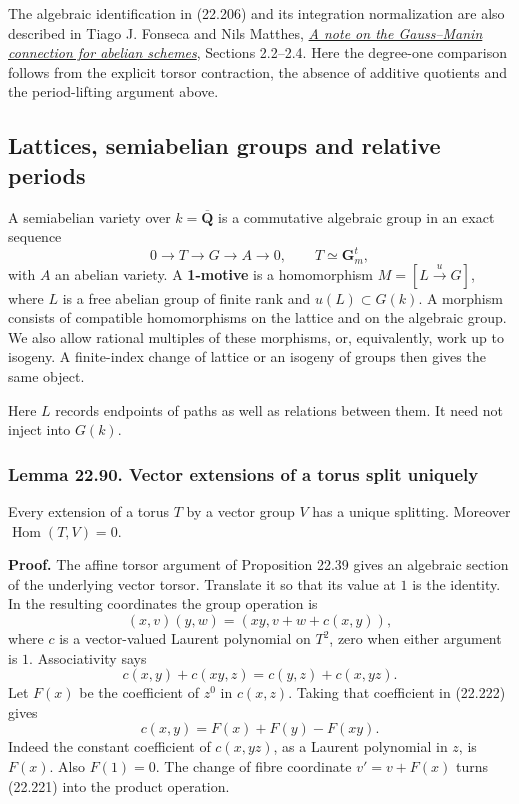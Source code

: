 \documentclass[
  11pt,
  a4paper,
]{article}
\begin{document}
The algebraic identification in (22.206) and its integration
normalization are also described in Tiago J. Fonseca and Nils Matthes,
\href{https://arxiv.org/abs/2201.06402}{\emph{A note on the Gauss--Manin
connection for abelian schemes}}, Sections 2.2--2.4. Here the degree-one
comparison follows from the explicit torsor contraction, the absence of
additive quotients and the period-lifting argument above.

\subsection{Lattices, semiabelian groups and relative
periods}\label{lattices-semiabelian-groups-and-relative-periods}

A semiabelian variety over \(k=\overline{\mathbf Q}\) is a commutative
algebraic group in an exact sequence \[
 0\longrightarrow T\longrightarrow G\longrightarrow A\longrightarrow0,
 \qquad T\simeq\mathbf G_m^t,
 \tag{22.220}
\] with \(A\) an abelian variety. A \textbf{1-motive} is a homomorphism
\(M=[L\xrightarrow{u}G]\), where \(L\) is a free abelian group of finite
rank and \(u(L)\subset G(k)\). A morphism consists of compatible
homomorphisms on the lattice and on the algebraic group. We also allow
rational multiples of these morphisms, or, equivalently, work up to
isogeny. A finite-index change of lattice or an isogeny of groups then
gives the same object.

Here \(L\) records endpoints of paths as well as relations between them.
It need not inject into \(G(k)\).

\subsubsection{Lemma 22.90. Vector extensions of a torus split
uniquely}\label{lemma-22.90.-vector-extensions-of-a-torus-split-uniquely}

Every extension of a torus \(T\) by a vector group \(V\) has a unique
splitting. Moreover \(\operatorname{Hom}(T,V)=0\).

\textbf{Proof.} The affine torsor argument of Proposition 22.39 gives an
algebraic section of the underlying vector torsor. Translate it so that
its value at \(1\) is the identity. In the resulting coordinates the
group operation is \[
 (x,v)(y,w)=(xy,v+w+c(x,y)),
 \tag{22.221}
\] where \(c\) is a vector-valued Laurent polynomial on \(T^2\), zero
when either argument is \(1\). Associativity says \[
 c(x,y)+c(xy,z)=c(y,z)+c(x,yz).
 \tag{22.222}
\] Let \(F(x)\) be the coefficient of \(z^0\) in \(c(x,z)\). Taking that
coefficient in (22.222) gives \[
 c(x,y)=F(x)+F(y)-F(xy).
 \tag{22.223}
\] Indeed the constant coefficient of \(c(x,yz)\), as a Laurent
polynomial in \(z\), is \(F(x)\). Also \(F(1)=0\). The change of fibre
coordinate \(v'=v+F(x)\) turns (22.221) into the product operation.
\end{document}
